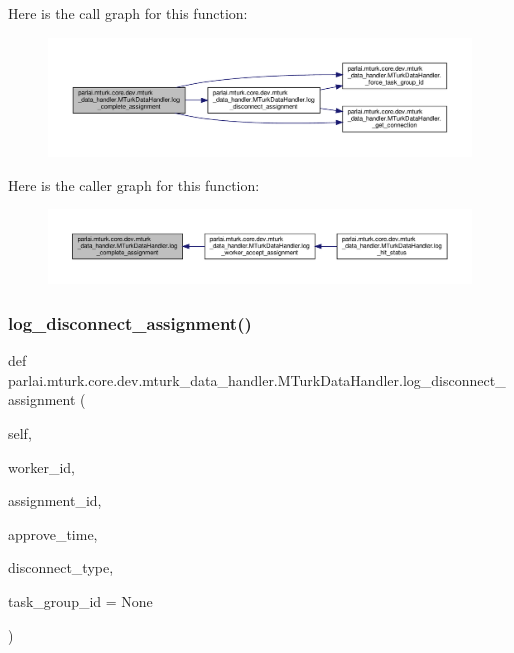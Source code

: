 Here is the call graph for this function\+:
\nopagebreak
\begin{figure}[H]
\begin{center}
\leavevmode
\includegraphics[width=350pt]{classparlai_1_1mturk_1_1core_1_1dev_1_1mturk__data__handler_1_1MTurkDataHandler_a07f6dfb250fe119f1fdd44c58e6c05aa_cgraph}
\end{center}
\end{figure}
Here is the caller graph for this function\+:
\nopagebreak
\begin{figure}[H]
\begin{center}
\leavevmode
\includegraphics[width=350pt]{classparlai_1_1mturk_1_1core_1_1dev_1_1mturk__data__handler_1_1MTurkDataHandler_a07f6dfb250fe119f1fdd44c58e6c05aa_icgraph}
\end{center}
\end{figure}
\mbox{\label{classparlai_1_1mturk_1_1core_1_1dev_1_1mturk__data__handler_1_1MTurkDataHandler_a42409b508f2b135f6d02c80f39aee466}} 
\subsubsection{\texorpdfstring{log\+\_\+disconnect\+\_\+assignment()}{log\_disconnect\_assignment()}}
{\footnotesize\ttfamily def parlai.\+mturk.\+core.\+dev.\+mturk\+\_\+data\+\_\+handler.\+M\+Turk\+Data\+Handler.\+log\+\_\+disconnect\+\_\+assignment (\begin{DoxyParamCaption}\item[{}]{self,  }\item[{}]{worker\+\_\+id,  }\item[{}]{assignment\+\_\+id,  }\item[{}]{approve\+\_\+time,  }\item[{}]{disconnect\+\_\+type,  }\item[{}]{task\+\_\+group\+\_\+id = {\ttfamily None} }\end{DoxyParamCaption})}

